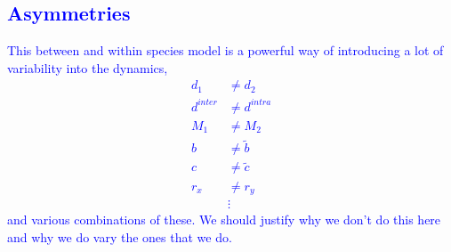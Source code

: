 \documentclass[times,onecolumn]{scrartcl}
\newcommand{\cha}[1]{\textcolor{blue}{#1}}
\begin{document}
\cha{\section*{Asymmetries}}

\cha{This between and within species model is a powerful way of introducing a lot of variability into the dynamics,
\begin{align}
	d_1 &\neq d_2 \\
	d^{inter} &\neq d^{intra} \\
	M_1 &\neq M_2 \\
	b &\neq \tilde{b} \\
	c &\neq \tilde{c} \\
	r_x &\neq r_y \\
	&\vdots
\end{align}
and various combinations of these. We should justify why we don't do this here and why we do vary the ones that we do.}


%
%
%
\end{document}
